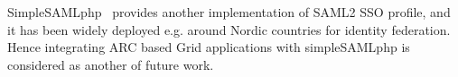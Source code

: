 \documentclass[conference]{IEEEtran}
\begin{document}
SimpleSAMLphp~\cite{simplesamllink} provides another implementation of SAML2 SSO
profile, and it has been widely deployed e.g. around Nordic countries for identity federation. Hence
integrating ARC based Grid applications with simpleSAMLphp is considered as another of
future work.



%
%



%
%
\end{document}
